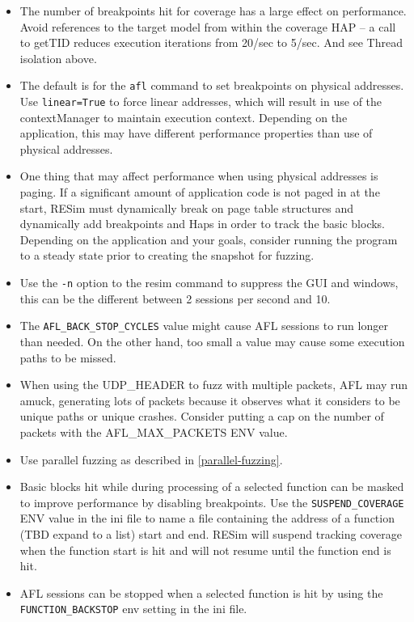 \documentclass[titlepage]{article}
\begin{document}
\begin{itemize}
\item The number of breakpoints hit for coverage has a large effect on performance.
Avoid references to the target model from within the coverage HAP -- a call to getTID reduces execution iterations from 20/sec to 5/sec.
And see Thread isolation above.

\item The default is for the {\tt afl} command to set breakpoints on physical addresses.  Use {\tt linear=True} to force linear addresses, which will
result in use of the contextManager to maintain execution context.  Depending on the application, this may have different performance properties than 
use of physical addresses.  

\item One thing that may affect performance when using physical addresses is paging. If a significant amount of application code is not paged in at the
start, RESim must dynamically break on page table structures and dynamically add breakpoints and Haps in order to track the basic blocks.  Depending on
the  application and your goals, consider running the program to a steady state prior to creating the snapshot for fuzzing.

\item Use the {\tt -n} option to the resim command to suppress the GUI and windows, this can be the different between 2 sessions per second and 10.

\item The {\tt AFL\_BACK\_STOP\_CYCLES} value might cause AFL sessions to run longer than needed.  On the other hand, too small a value may cause some
execution paths to be missed.

\item When using the UDP\_HEADER to fuzz with multiple packets, AFL may run amuck, generating lots of packets because it observes what it considers
to be unique paths or unique crashes.  Consider putting a cap on the number of packets with the AFL\_MAX\_PACKETS ENV value. 

\item Use parallel fuzzing as described in \ref{parallel-fuzzing}.

\item Basic blocks hit while during processing of a selected function can be masked to improve performance by disabling breakpoints.  
Use the {\tt SUSPEND\_COVERAGE} ENV value in the ini file to name a file containing the address of a function (TBD expand to a list) start and end.
RESim will suspend tracking coverage when the function start is hit and will not resume until the function end is hit.

\item AFL sessions can be stopped when a selected function is hit by using the {\tt FUNCTION\_BACKSTOP} env setting in the ini file.
\end{itemize}
\end{document}
